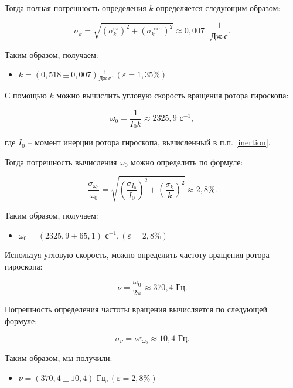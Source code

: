     Тогда полная погрешность определения $ k $ определяется следующим образом:

\[
\sigma_k = \sqrt{\left( \sigma_k^\text{сл} \right)^2 + \left( \sigma_k^\text{сист} \right)^2  } \approx 0,007 \text{ } \frac{1}{\text{Дж} \cdot \text{с}}.
\]

    Таким образом, получаем:

\begin{itemize}
	\item $ k =\left( 0,518 \pm 0,007 \right) \frac{1}{\text{Дж} \cdot \text{с}} , \left( \varepsilon = 1,35 \% \right) $
\end{itemize}

    С помощью $ k $ можно вычислить угловую скорость вращения ротора гироскопа:

\[
\omega_0 = \frac{1}{I_0 k} \approx 2325,9 \text{ с}^{-1},
\]
    
    где $ I_0 $ -- момент инерции ротора гироскопа, вычисленный в п.п. \ref{inertion}.

    Тогда погрешность вычисления $ \omega_0 $ можно определить по формуле:

\[
\frac{\sigma_{\omega_0}}{\omega_0} = \sqrt{\left( \frac{\sigma_{I_0}}{I_0} \right)^2 + \left( \frac{\sigma_k}{k} \right)^2} \approx 2,8 \%.
\]

    Таким образом, получаем:

\begin{itemize}
	\item {$ \omega_0 =\left( 2325,9 \pm 65,1 \right) \text{ с}^{-1} , \left( \varepsilon = 2,8 \% \right) $}
\end{itemize}

    Используя угловую скорость, можно определить частоту вращения ротора гироскопа:

\[
\nu = \frac{\omega_0}{2\pi} \approx 370,4 \text{ Гц}.
\]

    Погрешность определения частоты вращения вычисляется по следующей формуле:

\[
\sigma_\nu = \nu \varepsilon_{\omega_0} \approx 10,4 \text{ Гц}.
\]

    Таким образом, мы получили:

\begin{itemize}
	\item $ \nu = \left( 370,4 \pm 10,4 \right) \text{ Гц}, \left( \varepsilon = 2,8 \% \right)   $
\end{itemize}













